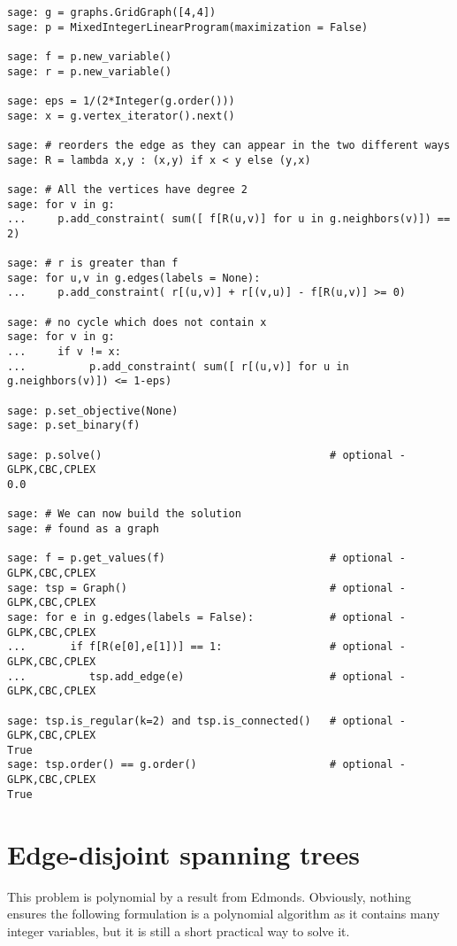 \begin{lstlisting}
sage: g = graphs.GridGraph([4,4])
sage: p = MixedIntegerLinearProgram(maximization = False)

sage: f = p.new_variable()
sage: r = p.new_variable()

sage: eps = 1/(2*Integer(g.order()))
sage: x = g.vertex_iterator().next()

sage: # reorders the edge as they can appear in the two different ways
sage: R = lambda x,y : (x,y) if x < y else (y,x)

sage: # All the vertices have degree 2
sage: for v in g:
...     p.add_constraint( sum([ f[R(u,v)] for u in g.neighbors(v)]) == 2)

sage: # r is greater than f
sage: for u,v in g.edges(labels = None):
...     p.add_constraint( r[(u,v)] + r[(v,u)] - f[R(u,v)] >= 0)

sage: # no cycle which does not contain x
sage: for v in g:
...     if v != x:
...          p.add_constraint( sum([ r[(u,v)] for u in g.neighbors(v)]) <= 1-eps)

sage: p.set_objective(None)
sage: p.set_binary(f)

sage: p.solve()                                    # optional - GLPK,CBC,CPLEX
0.0

sage: # We can now build the solution
sage: # found as a graph

sage: f = p.get_values(f)                          # optional - GLPK,CBC,CPLEX
sage: tsp = Graph()                                # optional - GLPK,CBC,CPLEX
sage: for e in g.edges(labels = False):            # optional - GLPK,CBC,CPLEX
...       if f[R(e[0],e[1])] == 1:                 # optional - GLPK,CBC,CPLEX
...          tsp.add_edge(e)                       # optional - GLPK,CBC,CPLEX

sage: tsp.is_regular(k=2) and tsp.is_connected()   # optional - GLPK,CBC,CPLEX
True
sage: tsp.order() == g.order()                     # optional - GLPK,CBC,CPLEX
True
\end{lstlisting}



\section{Edge-disjoint spanning trees}

This problem is polynomial by a result from Edmonds. Obviously, nothing ensures the following formulation is a polynomial algorithm as it contains many integer variables, but it is still a short practical way to solve it.

